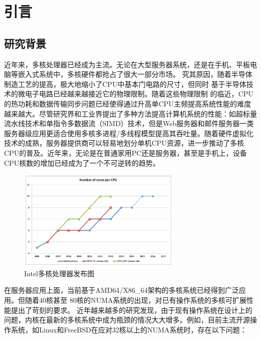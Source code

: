 

\chapter{引言}

\section{研究背景}

近年来，多核处理器已经成为主流。无论在大型服务器系统，还是在手机、平板电脑等嵌入式系统中，多核硬件都抢占了很大一部分市场。
究其原因，随着半导体制造工艺的提高，极大地缩小了CPU中基本门电路的尺寸，但同时
基于半导体技术的微电子电路已经越来越接近它的物理限制。随着这些物理限制
的临近，CPU的热功耗和数据传输同步问题已经使得通过升高单CPU主频提高系统性能的难度越来越大。尽管研究界和工业界提出了多种方法提高计算机系统的性能：如超标量流水线技术和单指令多数据流（SIMD）技术，但是Web服务器和邮件服务器一类服务器级应用更适合使用多核多进程/多线程模型提高其吞吐量。随着硬件虚拟化技术的成熟，服务器提供商可以轻易地划分单机CPU资源，进一步推动了多核CPU的普及。近年来，无论是在普通家用PC还是服务器，甚至是手机上，设备CPU核数的增加已经成为了一个不可逆转的趋势。

\begin{figure}[ht]
\begin{center}
\includegraphics[width=0.7\textwidth]{figures/intro_roadmap.png}
\end{center}
\caption{Intel多核处理器发布图\protect\footnotemark}
\label{fig:intro_roadmap}
\end{figure}
在服务器应用上面，当前基于AMD64/X86\_64架构的多核系统已经得到广泛应用。但随着40核甚至
80核的NUMA系统的出现，对已有操作系统的多核可扩展性能提出了苛刻的要求。
近年越来越多的研究发现\cite{radixvm:eurosys13}，由于现有操作系统在设计上的问题，内核在最新的多核系统中成为瓶颈的情况大大增多。例如，目前主流开源操作系统，如Linux和FreeBSD在应对32核以上的NUMA系统时，存在以下问题：

